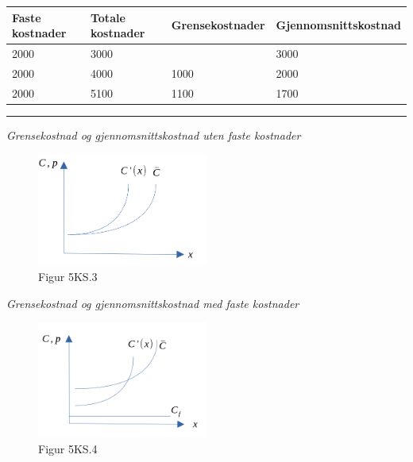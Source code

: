 \documentclass[
  letterpaper,
  DIV=11,
  numbers=noendperiod]{scrartcl}
\begin{document}
\begin{tabular}[t]{l|l|l|l}
\hline
Faste kostnader & Totale kostnader & Grensekostnader & Gjennomsnittskostnad\\
\hline
2000 & 3000 &  & 3000\\
\hline
2000 & 4000 & 1000 & 2000\\
\hline
2000 & 5100 & 1100 & 1700\\
\hline
\end{tabular}

\begin{center}\rule{0.5\linewidth}{0.5pt}\end{center}

\emph{Grensekostnad og gjennomsnittskostnad uten faste kostnader}

\begin{figure}[H]

{\centering \includegraphics[width=0.5\textwidth,height=\textheight]{drawio/kostku.png}

}

\caption{Figur 5KS.3}

\end{figure}%

\emph{Grensekostnad og gjennomsnittskostnad med faste kostnader}

\begin{figure}[H]

{\centering \includegraphics[width=0.5\textwidth,height=\textheight]{drawio/kostkm.png}

}

\caption{Figur 5KS.4}

\end{figure}%
\end{document}
